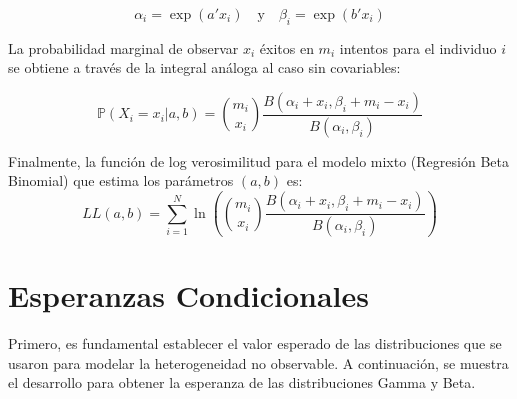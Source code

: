 \documentclass[
]{book}
\begin{document}
\[\alpha_i = \exp(a'x_i) \quad \text{y} \quad \beta_i = \exp(b'x_i)\]

La probabilidad marginal de observar \(x_i\) éxitos en \(m_i\) intentos para
el individuo \(i\) se obtiene a través de la integral análoga al caso sin
covariables:

\[
\mathbb{P} (X_i = x_i|a, b) = \binom{m_i}{x_i} \frac{B(\alpha_i + x_i, \beta_i + m_i - x_i)}{B(\alpha_i,\beta_i)}
\]

Finalmente, la función de log verosimilitud para el modelo mixto
(Regresión Beta Binomial) que estima los parámetros \((a, b)\) es: \[
LL(a, b) = \sum_{i=1}^{N} \ln \left( \binom{m_i}{x_i} \frac{B(\alpha_i + x_i, \beta_i + m_i - x_i)}{B(\alpha_i,\beta_i)} \right)
\]

\section{Esperanzas Condicionales}\label{esperanzas-condicionales}

Primero, es fundamental establecer el valor esperado de las
distribuciones que se usaron para modelar la heterogeneidad no
observable. A continuación, se muestra el desarrollo para obtener la
esperanza de las distribuciones Gamma y Beta.
\end{document}
